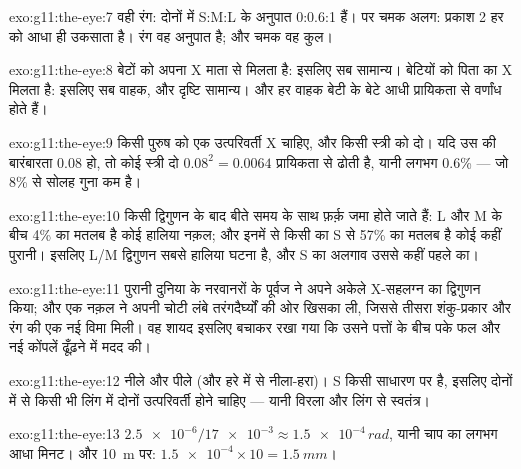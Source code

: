 \begin{solution}{exo:g11:the-eye:7}
वही रंग: दोनों में S:M:L के अनुपात 0:0.6:1 हैं। पर चमक अलग: प्रकाश 2 हर
 को आधा ही उकसाता है। रंग वह अनुपात है; और चमक वह कुल।
\end{solution}

\begin{solution}{exo:g11:the-eye:8}
बेटों को अपना X माता से मिलता है: इसलिए सब सामान्य। बेटियों को पिता का X
मिलता है: इसलिए सब वाहक, और दृष्टि सामान्य। और हर वाहक बेटी के बेटे आधी
प्रायिकता से वर्णांध होते हैं।
\end{solution}

\begin{solution}{exo:g11:the-eye:9}
किसी पुरुष को एक उत्परिवर्ती X चाहिए, और किसी स्त्री को दो। यदि उस 
की बारंबारता 0.08 हो, तो कोई स्त्री दो $0.08^2 = 0.0064$ प्रायिकता से ढोती
है, यानी लगभग 0.6\% --- जो 8\% से सोलह गुना कम है।
\end{solution}

\begin{solution}{exo:g11:the-eye:10}
किसी द्विगुणन के बाद बीते समय के साथ फ़र्क़ जमा होते जाते हैं: L और M के
बीच 4\% का मतलब है कोई हालिया नक़ल; और इनमें से किसी का S से 57\% का मतलब
है कोई कहीं पुरानी। इसलिए L/M द्विगुणन सबसे हालिया घटना है, और S का अलगाव
उससे कहीं पहले का।
\end{solution}

\begin{solution}{exo:g11:the-eye:11}
पुरानी दुनिया के नरवानरों के पूर्वज ने अपने अकेले X-सहलग्न   का
द्विगुणन किया; और एक नक़ल ने अपनी चोटी लंबे तरंगदैर्घ्यों की ओर खिसका ली,
जिससे तीसरा शंकु-प्रकार और रंग की एक नई विमा मिली। वह शायद इसलिए बचाकर रखा
गया कि उसने पत्तों के बीच पके फल और नई कोंपलें ढूँढ़ने में मदद की।
\end{solution}

\begin{solution}{exo:g11:the-eye:12}
नीले और पीले (और हरे में से नीला-हरा)। S  किसी साधारण  पर है,
इसलिए दोनों में से किसी भी लिंग में दोनों  उत्परिवर्ती होने चाहिए ---
यानी विरला और लिंग से स्वतंत्र।
\end{solution}

\begin{solution}{exo:g11:the-eye:13}
$\num{2.5e-6}/\num{17e-3} \approx \num{1.5e-4}\,\unit{rad}$, यानी चाप का
लगभग आधा मिनट। और \qty{10}{m} पर: $\num{1.5e-4} \times 10 =
\qty{1.5}{mm}$।
\end{solution}

